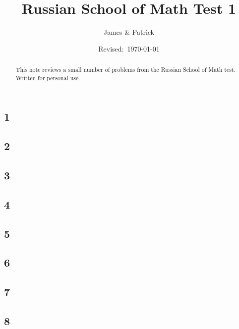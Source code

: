 \documentclass[12pt]{article}
\title{Russian School of Math Test 1}
\author{James \& Patrick}
\date{Revised:~\today}
\newif\ifsolution\solutiontrue%
\newif\ifanswer\answertrue%
\begin{document}
\maketitle
\begin{abstract}\setlength{\parindent}{0pt}%
This note reviews a small number of problems from the Russian School of Math test. Written for personal use.
\end{abstract}

\thispagestyle{empty}
\clearpage

\subsection*{1}

\ifsolution
  
\fi

\subsection*{2}

\ifsolution
  
\fi

\subsection*{3}

\ifsolution
  
\fi

\subsection*{4}

\ifsolution
  
\fi

\subsection*{5}

\ifsolution
  
\fi

\subsection*{6}

\ifsolution
  
\fi

\subsection*{7}

\ifsolution
  
\fi

\subsection*{8}

\ifsolution
  
\fi
\end{document}
